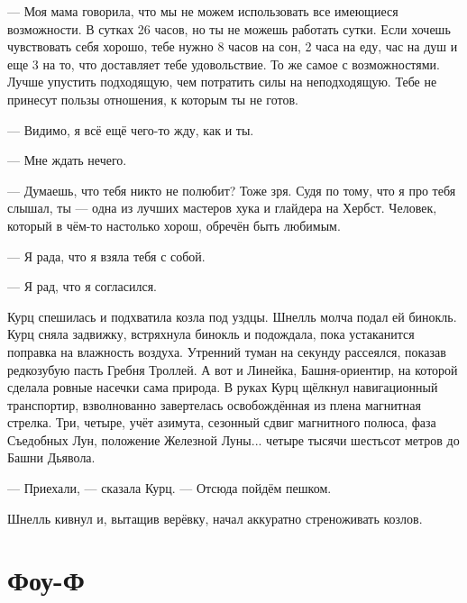 --- Моя мама говорила, что мы не можем использовать все имеющиеся возможности.
В сутках 26 часов, но ты не можешь работать сутки.
Если хочешь чувствовать себя хорошо, тебе нужно 8 часов на сон, 2 часа на еду, час на душ и еще 3 на то, что доставляет тебе удовольствие.
То же самое с возможностями.
Лучше упустить подходящую, чем потратить силы на неподходящую.
Тебе не принесут пользы отношения, к которым ты не готов.

--- Видимо, я всё ещё чего-то жду, как и ты.

--- Мне ждать нечего.

--- Думаешь, что тебя никто не полюбит?
Тоже зря.
Судя по тому, что я про тебя слышал, ты --- одна из лучших мастеров хука и глайдера на Хербст.
Человек, который в чём-то настолько хорош, обречён быть любимым.

--- Я рада, что я взяла тебя с собой.

--- Я рад, что я согласился.

Курц спешилась и подхватила козла под уздцы.
Шнелль молча подал ей бинокль.
Курц сняла задвижку, встряхнула бинокль и подождала, пока устаканится поправка на влажность воздуха.
Утренний туман на секунду рассеялся, показав редкозубую пасть Гребня Троллей.
А вот и Линейка, Башня-ориентир, на которой сделала ровные насечки сама природа.
В руках Курц щёлкнул навигационный транспортир, взволнованно завертелась освобождённая из плена магнитная стрелка.
Три, четыре, учёт азимута, сезонный сдвиг магнитного полюса, фаза Съедобных Лун, положение Железной Луны\FM... четыре тысячи шестьсот метров до Башни Дьявола.

--- Приехали, --- сказала Курц.
--- Отсюда пойдём пешком.

Шнелль кивнул и, вытащив верёвку, начал аккуратно стреноживать козлов.

\section{Фоу-Ф}


